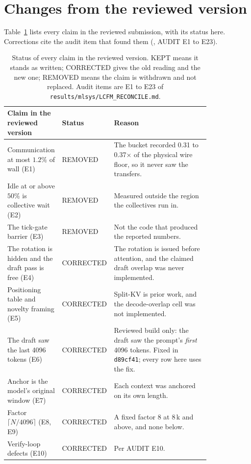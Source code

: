 \documentclass{article}
\begin{document}
\appendix

\section{Changes from the reviewed version}
\label{app:changes}

Table~\ref{tab:changes} lists every claim in the reviewed submission, with its status here. Corrections cite the audit item
that found them (, AUDIT E1 to E23).

\begin{table}[h]
\centering\footnotesize
\caption{Status of every claim in the reviewed version. KEPT means it stands as written;
CORRECTED gives the old reading and the new one; REMOVED means the claim is withdrawn and not
replaced. Audit items are E1 to E23 of \texttt{results/mlsys/LCFM\_RECONCILE.md}.}
\label{tab:changes}
\setlength{\tabcolsep}{2pt}\begin{tabular}{p{0.20\linewidth} p{0.155\linewidth} p{0.47\linewidth}}
\toprule
Claim in the reviewed version & Status & Reason \\
\midrule
Communication at most $1.2\%$ of wall (E1) & REMOVED & The bucket recorded 0.31 to 0.37$\times$ of the physical wire floor, so it never saw the transfers. \\
Idle at or above $50\%$ is collective wait (E2) & REMOVED & Measured outside the region the collectives run in. \\
The tick-gate barrier (E3) & REMOVED & Not the code that produced the reported numbers. \\
The rotation is hidden and the draft pass is free (E4) & CORRECTED & The rotation is issued before attention, and the claimed draft overlap was never implemented. \\
Positioning table and novelty framing (E5) & CORRECTED & Split-KV is prior work, and the decode-overlap cell was not implemented. \\
The draft saw the last 4096 tokens (E6) & CORRECTED & Reviewed build only: the draft saw the prompt's \emph{first} 4096 tokens. Fixed in \texttt{d89cf41}; every row here uses the fix. \\
Anchor is the model's original window (E7) & CORRECTED & Each context was anchored on its own length. \\
Factor $\lceil N/4096\rceil$ (E8, E9) & CORRECTED & A fixed factor 8 at 8\,k and above, and none below. \\
Verify-loop defects (E10) & CORRECTED & Per AUDIT E10. \\

\end{tabular}
\end{table}
\end{document}
